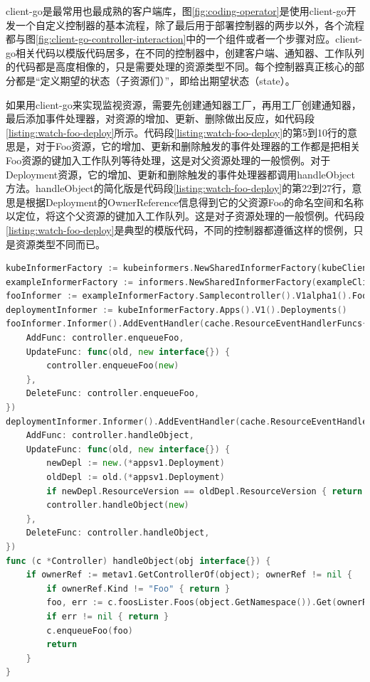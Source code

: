 \documentclass[macfonts,master]{njuthesis}
\begin{document}
client-go是最常用也最成熟的客户端库，图\ref{fig:coding-operator}是使用client-go开发一个自定义控制器的基本流程，除了最后用于部署控制器的两步以外，各个流程都与图\ref{fig:client-go-controller-interaction}中的一个组件或者一个步骤对应。client-go相关代码以模版代码居多，在不同的控制器中，创建客户端、通知器、工作队列的代码都是高度相像的，只是需要处理的资源类型不同。每个控制器真正核心的部分都是``定义期望的状态（子资源们）''，即给出期望状态（state）。

如果用client-go来实现监视资源，需要先创建通知器工厂，再用工厂创建通知器，最后添加事件处理器，对资源的增加、更新、删除做出反应，如代码段\ref{listing:watch-foo-deploy}所示。代码段\ref{listing:watch-foo-deploy}的第5到10行的意思是，对于Foo资源，它的增加、更新和删除触发的事件处理器的工作都是把相关Foo资源的键加入工作队列等待处理，这是对父资源处理的一般惯例。对于Deployment资源，它的增加、更新和删除触发的事件处理器都调用handleObject方法。handleObject的简化版是代码段\ref{listing:watch-foo-deploy}的第22到27行，意思是根据Deployment的OwnerReference信息得到它的父资源Foo的命名空间和名称以定位，将这个父资源的键加入工作队列。这是对子资源处理的一般惯例。代码段\ref{listing:watch-foo-deploy}是典型的模版代码，不同的控制器都遵循这样的惯例，只是资源类型不同而已。


\begin{lstlisting}[language=Go,caption=sample-controller中监视Foo和Deployment的代码段,label=listing:watch-foo-deploy]
kubeInformerFactory := kubeinformers.NewSharedInformerFactory(kubeClient, time.Second*30)
exampleInformerFactory := informers.NewSharedInformerFactory(exampleClient, time.Second*30)
fooInformer := exampleInformerFactory.Samplecontroller().V1alpha1().Foos()
deploymentInformer := kubeInformerFactory.Apps().V1().Deployments()
fooInformer.Informer().AddEventHandler(cache.ResourceEventHandlerFuncs{
	AddFunc: controller.enqueueFoo,
	UpdateFunc: func(old, new interface{}) {
		controller.enqueueFoo(new)
	},
	DeleteFunc: controller.enqueueFoo,
})
deploymentInformer.Informer().AddEventHandler(cache.ResourceEventHandlerFuncs{
	AddFunc: controller.handleObject,
	UpdateFunc: func(old, new interface{}) {
		newDepl := new.(*appsv1.Deployment)
		oldDepl := old.(*appsv1.Deployment)
		if newDepl.ResourceVersion == oldDepl.ResourceVersion { return }
		controller.handleObject(new)
	},
	DeleteFunc: controller.handleObject,
})
func (c *Controller) handleObject(obj interface{}) {
	if ownerRef := metav1.GetControllerOf(object); ownerRef != nil {
		if ownerRef.Kind != "Foo" { return }
		foo, err := c.foosLister.Foos(object.GetNamespace()).Get(ownerRef.Name)
		if err != nil { return }
		c.enqueueFoo(foo)
		return
	}
}
\end{lstlisting}
\end{document}
